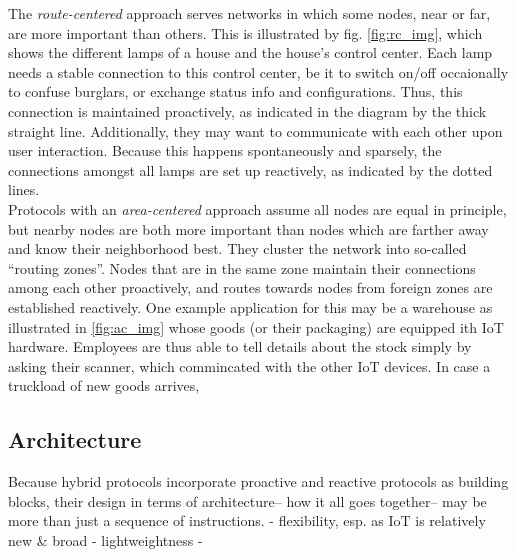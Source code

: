\documentclass[a4paper,10pt]{scrartcl}
\begin{document}
The \emph{route-centered} approach serves networks in which some nodes, near or far, are more important than others. This is illustrated by fig. \ref{fig:rc_img}, which shows the different lamps of a house and the house's control center. Each lamp needs a stable connection to this control center, be it to switch on/off occaionally to confuse burglars, or exchange status info and configurations. Thus, this connection is maintained proactively, as indicated in the diagram by the thick straight line. Additionally, they may want to communicate with each other upon user interaction. Because this happens spontaneously and sparsely, the connections amongst all lamps are set up reactively, as indicated by the dotted lines.\\
Protocols with an \emph{area-centered} approach assume all nodes are equal in principle, but nearby nodes are both more important than nodes which are farther away and know their neighborhood best. They cluster the network into so-called ``routing zones''. Nodes that are in the same zone maintain their connections among each other proactively, and routes towards nodes from foreign zones are established reactively. 
One example application for this may be a warehouse as illustrated in \ref{fig:ac_img} whose goods (or their packaging) are equipped ith IoT hardware. Employees are thus able to tell details about the stock simply by asking their scanner, which commincated with the other IoT devices. In case a truckload of new goods arrives, 

\subsection{Architecture}
\label{subsec:architecture}
Because hybrid protocols incorporate proactive and reactive protocols as building blocks, their design in terms of architecture-- how it all goes together-- may be more than just a sequence of instructions.
- flexibility, esp. as IoT is relatively new \& broad
- lightweightness
- 
\end{document}
